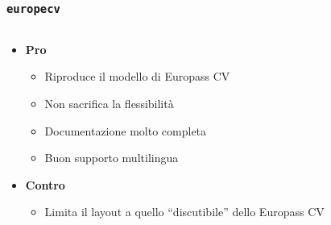 \documentclass[svgnames,%
	ucs,%
	pdftex]{guitbeamer}
\begin{document}
\begin{frame}
  \frametitle{\texttt{europecv}}
	\begin{columns}[c]
		\begin{column}{0.6\linewidth}
			\begin{itemize}
			\item \textbf{Pro}
				\begin{itemize}
				\item Riproduce il modello di Europass CV
				\item Non sacrifica la flessibilit\`a
				\item Documentazione molto completa
				\item Buon supporto multilingua
				\end{itemize}\bigskip
			\item \textbf{Contro}
				\begin{itemize}
				\item Limita il layout a quello ``discutibile'' dello Europass CV
				\end{itemize}
			\end{itemize}
		\end{column}
		\begin{column}{0.4\linewidth}
			\centering
		\end{column}
	\end{columns}
\end{frame}
\end{document}
